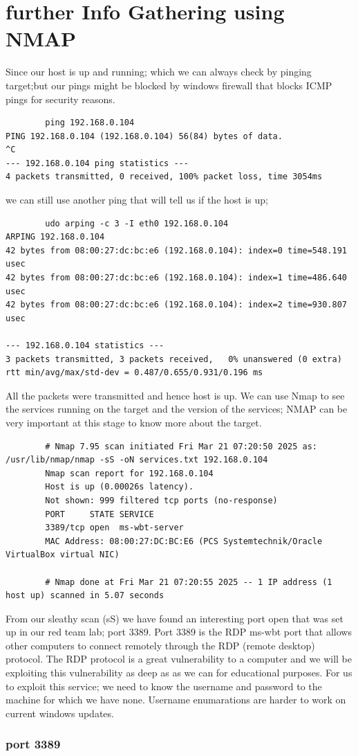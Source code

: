 \documentclass[a4paper,12pt]{article}
\begin{document}
\newpage{}
\section{further Info Gathering using NMAP}
Since our host is up and running; which we can always check by pinging target;but our pings might be blocked by windows firewall
that blocks ICMP pings for security reasons.
\begin{verbatim}
        ping 192.168.0.104
PING 192.168.0.104 (192.168.0.104) 56(84) bytes of data.
^C
--- 192.168.0.104 ping statistics ---
4 packets transmitted, 0 received, 100% packet loss, time 3054ms
\end{verbatim}
we can still use another ping that will tell us if the host is up;
\begin{verbatim}
        udo arping -c 3 -I eth0 192.168.0.104
ARPING 192.168.0.104
42 bytes from 08:00:27:dc:bc:e6 (192.168.0.104): index=0 time=548.191 usec
42 bytes from 08:00:27:dc:bc:e6 (192.168.0.104): index=1 time=486.640 usec
42 bytes from 08:00:27:dc:bc:e6 (192.168.0.104): index=2 time=930.807 usec

--- 192.168.0.104 statistics ---
3 packets transmitted, 3 packets received,   0% unanswered (0 extra)
rtt min/avg/max/std-dev = 0.487/0.655/0.931/0.196 ms

\end{verbatim}
All the packets were transmitted and hence host is up.
We can use Nmap to see the services running on the target and the version of the services; NMAP can be very important at this stage 
to know more about the target.
\begin{verbatim}
        # Nmap 7.95 scan initiated Fri Mar 21 07:20:50 2025 as: /usr/lib/nmap/nmap -sS -oN services.txt 192.168.0.104
        Nmap scan report for 192.168.0.104
        Host is up (0.00026s latency).
        Not shown: 999 filtered tcp ports (no-response)
        PORT     STATE SERVICE
        3389/tcp open  ms-wbt-server
        MAC Address: 08:00:27:DC:BC:E6 (PCS Systemtechnik/Oracle VirtualBox virtual NIC)
        
        # Nmap done at Fri Mar 21 07:20:55 2025 -- 1 IP address (1 host up) scanned in 5.07 seconds      
\end{verbatim}
From our sleathy scan (sS) we have found an interesting port open that was set up in our red team lab; port 3389.
Port 3389 is the RDP ms-wbt port that allows other computers to connect remotely through the RDP (remote desktop) protocol.
The RDP protocol is a great vulnerability to a computer and we will be exploiting this vulnerability as deep as as we can for
educational purposes.
For us to exploit this service; we need to know the username and password to the machine for which we have none.
Username enumarations are harder to work on current windows updates.
\subsubsection{port 3389}
\end{document}
